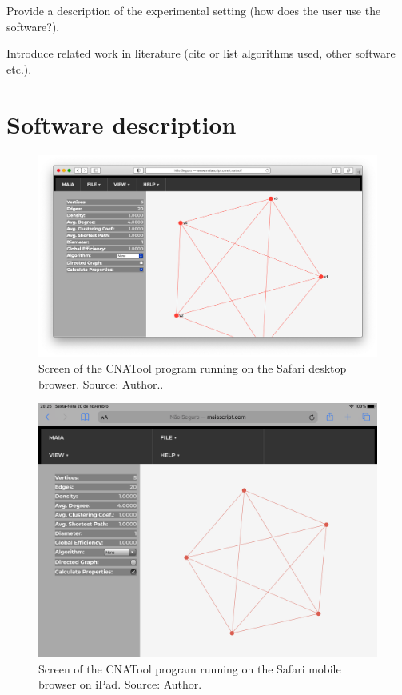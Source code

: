 \documentclass[preprint,12pt, a4paper]{elsarticle}
\begin{document}
Provide a description of the experimental setting (how does the user use the software?).

Introduce related work in literature (cite or list algorithms used, other software etc.).


\section{Software description}
\label{description}

\begin{figure}[!htbp]
    \begin{center}
        \includegraphics[scale=0.2]{images/macbook.png}
    \end{center}
    \caption{Screen of the CNATool program running on the Safari desktop browser. Source: Author..}
    \label{fig:macbook}
\end{figure}

\begin{figure}[!htbp]
    \begin{center}
        \includegraphics[scale=0.2]{images/ipad.png}
    \end{center}
    \caption{Screen of the CNATool program running on the Safari mobile browser on iPad. Source: Author.}
    \label{fig:ipad}
\end{figure}
\end{document}
